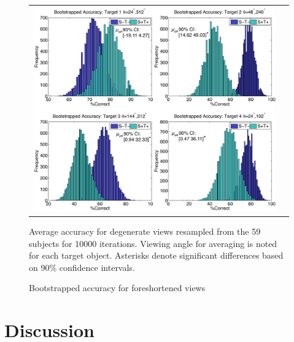 \documentclass[dwyatte_dissertation.tex]{subfiles}
\begin{document}
\begin{figure}[h!]
\begin{center}
\begin{tabular}{ll}
\includegraphics[width=160mm]{figs/chap_bpleast/results_bootstrap_montage.pdf}
\end{tabular}
\end{center}
\caption{Bootstrapped accuracy for foreshortened views}{Average accuracy for degenerate views resampled from the 59 subjects for 10000 iterations. Viewing angle for averaging is noted for each target object. Asterisks denote significant differences based on 90\% confidence intervals.}
\label{fig:bpleast_behave_bootstrap}
\end{figure}

\section{Discussion}



\end{document}
